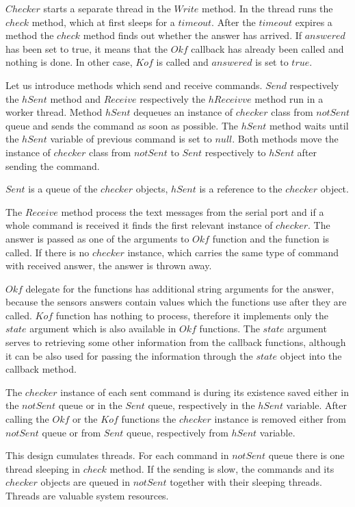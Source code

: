   $Checker$ starts a separate thread in the $Write$ method. In the thread runs the $check$ method, which at first sleeps for a $timeout$.
  After the $timeout$ expires a method the $check$ method finds out whether the answer has arrived.
  If $answered$ has been set to true, it means that the $Okf$ callback has already been 
  called and nothing is done. In other case, $Kof$ is called and $answered$ is set to $true$.

  Let us introduce methods which send and receive commands.
  $Send$ respectively  the $hSent$ method and $Receive$ respectively the $hReceivve$ method run in a worker thread. 
  Method $hSent$ dequeues an instance of $checker$ class from $notSent$ queue and
  sends the command as soon as possible. The $hSent$ method waits until the $hSent$ variable
  of previous command is set to $null$. Both methods move the instance
  of $checker$ class from $notSent$ to $Sent$ respectively to $hSent$ after sending the command.

  $Sent$ is a queue of the $checker$ objects, $hSent$ is a reference to the $checker$ object. 
  
  \label{p:oneargument}
  The $Receive$ method process the text messages from the serial port and if a whole command is received
  it finds the first relevant instance of  $checker$.
  The answer is passed as one of the arguments to $Okf$ function and the function is called.
  If there is no $checker$ instance, which carries the same type of command with received answer,
  the answer is thrown away.

  $Okf$ delegate for the functions has additional string arguments for the answer, because the sensors answers contain values
  which the functions use after they are called.
  $Kof$ function has nothing to process, therefore it implements only the $state$ argument 
  which is also available in $Okf$ functions. The $state$ argument serves to retrieving
  some other information from the callback functions, although it can be also used for
  passing the information through the $state$ object into the callback method.

  The $checker$ instance of each sent command is during its existence saved either in the $notSent$
  queue or in the $Sent$ queue, respectively in the $hSent$ variable.
  After calling the $Okf$ or the $Kof$ functions the $checker$ instance is removed either from $notSent$ queue
  or from $Sent$ queue, respectively from $hSent$ variable. 

  This design cumulates threads. For each command in $notSent$ queue there is 
  one thread sleeping in $check$ method. If the sending is slow, the commands and its $checker$ objects are queued in
  $notSent$ together with their sleeping threads. Threads are valuable system resources. 

